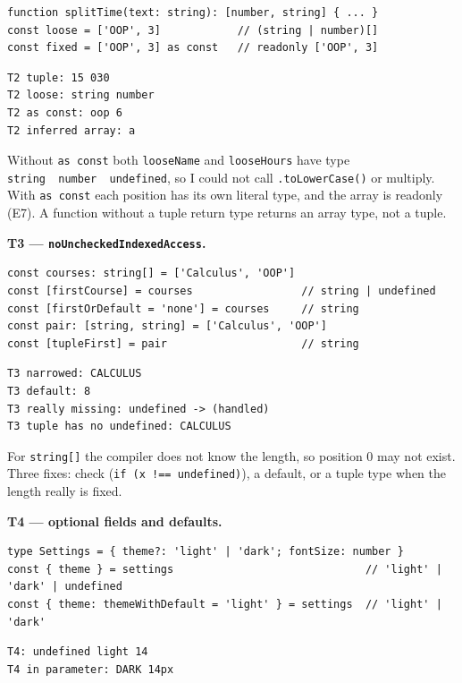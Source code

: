 \documentclass[
  10pt,
]{article}
\begin{document}
\begin{verbatim}
function splitTime(text: string): [number, string] { ... }
const loose = ['OOP', 3]            // (string | number)[]
const fixed = ['OOP', 3] as const   // readonly ['OOP', 3]
\end{verbatim}

\begin{verbatim}
T2 tuple: 15 030
T2 loose: string number
T2 as const: oop 6
T2 inferred array: a
\end{verbatim}

Without \texttt{as\ const} both \texttt{looseName} and
\texttt{looseHours} have type
\texttt{string\ \textbar{}\ number\ \textbar{}\ undefined}, so I could
not call \texttt{.\allowbreak{}toLowerCase()} or multiply. With
\texttt{as\ const} each position has its own literal type, and the array
is readonly (E7). A function without a tuple return type returns an
array type, not a tuple.

\textbf{T3 --- \texttt{noUncheckedIndexedAccess}.}

\begin{verbatim}
const courses: string[] = ['Calculus', 'OOP']
const [firstCourse] = courses                 // string | undefined
const [firstOrDefault = 'none'] = courses     // string
const pair: [string, string] = ['Calculus', 'OOP']
const [tupleFirst] = pair                     // string
\end{verbatim}

\begin{verbatim}
T3 narrowed: CALCULUS
T3 default: 8
T3 really missing: undefined -> (handled)
T3 tuple has no undefined: CALCULUS
\end{verbatim}

For \texttt{string{[}{]\allowbreak{}}} the compiler does not know the
length, so position 0 may not exist. Three fixes: check
(\texttt{if\ (x\ !==\ undefined)}), a default, or a tuple type when the
length really is fixed.

\textbf{T4 --- optional fields and defaults.}

\begin{verbatim}
type Settings = { theme?: 'light' | 'dark'; fontSize: number }
const { theme } = settings                              // 'light' | 'dark' | undefined
const { theme: themeWithDefault = 'light' } = settings  // 'light' | 'dark'
\end{verbatim}

\begin{verbatim}
T4: undefined light 14
T4 in parameter: DARK 14px
\end{verbatim}
\end{document}
